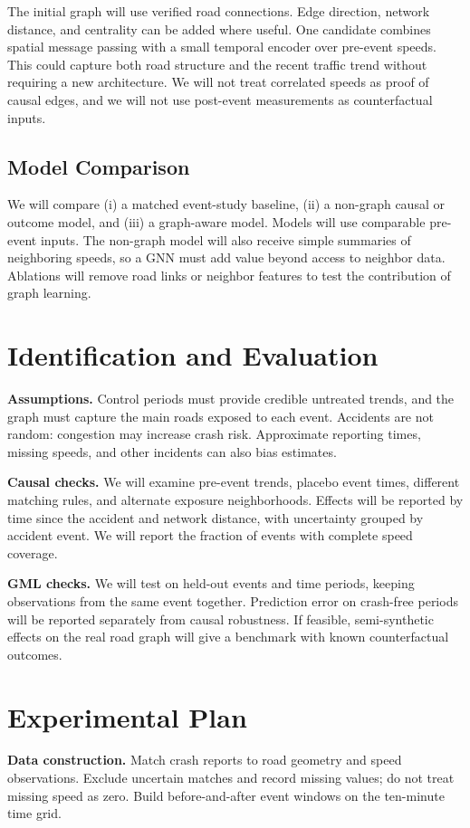 \documentclass[sigconf,nonacm]{acmart}
\begin{document}
The initial graph will use verified road connections. Edge direction, network distance, and centrality can be added where useful. One candidate combines spatial message passing with a small temporal encoder over pre-event speeds. This could capture both road structure and the recent traffic trend without requiring a new architecture. We will not treat correlated speeds as proof of causal edges, and we will not use post-event measurements as counterfactual inputs.

\subsection{Model Comparison}
We will compare (i) a matched event-study baseline, (ii) a non-graph causal or outcome model, and (iii) a graph-aware model. Models will use comparable pre-event inputs. The non-graph model will also receive simple summaries of neighboring speeds, so a GNN must add value beyond access to neighbor data. Ablations will remove road links or neighbor features to test the contribution of graph learning.

\section{Identification and Evaluation}
\textbf{Assumptions.} Control periods must provide credible untreated trends, and the graph must capture the main roads exposed to each event. Accidents are not random: congestion may increase crash risk. Approximate reporting times, missing speeds, and other incidents can also bias estimates.

\textbf{Causal checks.} We will examine pre-event trends, placebo event times, different matching rules, and alternate exposure neighborhoods. Effects will be reported by time since the accident and network distance, with uncertainty grouped by accident event. We will report the fraction of events with complete speed coverage.

\textbf{GML checks.} We will test on held-out events and time periods, keeping observations from the same event together. Prediction error on crash-free periods will be reported separately from causal robustness. If feasible, semi-synthetic effects on the real road graph will give a benchmark with known counterfactual outcomes.

\section{Experimental Plan}
\textbf{Data construction.} Match crash reports to road geometry and speed observations. Exclude uncertain matches and record missing values; do not treat missing speed as zero. Build before-and-after event windows on the ten-minute time grid.
\end{document}

